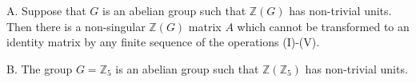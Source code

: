 A. Suppose that $G$ is an abelian group such that $\mathbb{Z}(G)$ has non-trivial units. Then there is a non-singular $\mathbb{Z}(G)$ matrix $A$ which cannot be transformed to an identity matrix by any finite sequence of the operations (I)-(V).

B. The group $G = \mathbb{Z}_5$ is an abelian group such that $\mathbb{Z}(\mathbb{Z}_5)$ has non-trivial units.
